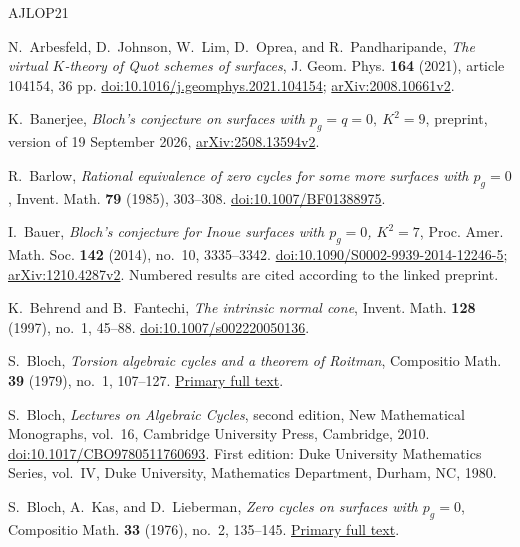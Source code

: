 \begin{thebibliography}{AJLOP21}

N.~Arbesfeld, D.~Johnson, W.~Lim, D.~Oprea, and R.~Pandharipande,
\emph{The virtual $K$-theory of Quot schemes of surfaces},
J. Geom. Phys. \textbf{164} (2021), article 104154, 36 pp.
\href{https://doi.org/10.1016/j.geomphys.2021.104154}{doi:10.1016/j.geomphys.2021.104154};
\href{https://arxiv.org/abs/2008.10661v2}{arXiv:2008.10661v2}.

K.~Banerjee,
\emph{Bloch's conjecture on surfaces with $p_g=q=0,\ K^2=9$},
preprint, version of 19 September 2026,
\href{https://arxiv.org/abs/2508.13594v2}{arXiv:2508.13594v2}.

R.~Barlow,
\emph{Rational equivalence of zero cycles for some more surfaces with $p_g=0$},
Invent. Math. \textbf{79} (1985), 303--308.
\href{https://doi.org/10.1007/BF01388975}{doi:10.1007/BF01388975}.

I.~Bauer,
\emph{Bloch's conjecture for Inoue surfaces with $p_g=0$, $K^2=7$},
Proc. Amer. Math. Soc. \textbf{142} (2014), no.~10, 3335--3342.
\href{https://doi.org/10.1090/S0002-9939-2014-12246-5}{doi:10.1090/S0002-9939-2014-12246-5};
\href{https://arxiv.org/abs/1210.4287v2}{arXiv:1210.4287v2}.
Numbered results are cited according to the linked preprint.

K.~Behrend and B.~Fantechi,
\emph{The intrinsic normal cone},
Invent. Math. \textbf{128} (1997), no.~1, 45--88.
\href{https://doi.org/10.1007/s002220050136}{doi:10.1007/s002220050136}.

S.~Bloch, \emph{Torsion algebraic cycles and a theorem of Roitman},
Compositio Math. \textbf{39} (1979), no.~1, 107--127.
\href{https://www.numdam.org/item/CM_1979__39_1_107_0.pdf}{Primary full text}.

S.~Bloch, \emph{Lectures on Algebraic Cycles}, second edition,
New Mathematical Monographs, vol.~16, Cambridge University Press,
Cambridge, 2010.
\href{https://doi.org/10.1017/CBO9780511760693}{doi:10.1017/CBO9780511760693}.
First edition: Duke University Mathematics Series, vol.~IV,
Duke University, Mathematics Department, Durham, NC, 1980.

S.~Bloch, A.~Kas, and D.~Lieberman,
\emph{Zero cycles on surfaces with $p_g=0$},
Compositio Math. \textbf{33} (1976), no.~2, 135--145.
\href{https://www.numdam.org/item/CM_1976__33_2_135_0.pdf}{Primary full text}.


\end{thebibliography}
